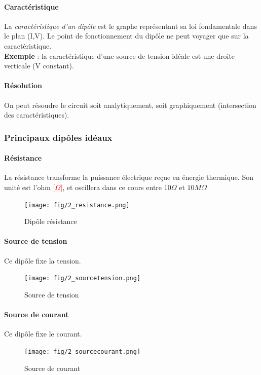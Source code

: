 \documentclass[a4paper]{article}
\begin{document}
    \paragraph{Caractéristique} La \textit{caractéristique d'un dipôle} est le
    graphe représentant sa loi fondamentale dans le plan (I,V). Le point de fonctionnement
    du dipôle ne peut voyager que sur la caractéristique. \\
    \textbf{Exemple} : la caractéristique d'une source de tension idéale est une
    droite verticale (V constant).

    \paragraph{Résolution} On peut résoudre le circuit soit analytiquement, soit
    graphiquement (intersection des caractéristiques).

    \subsubsection{Principaux dipôles idéaux}
    \paragraph{Résistance} La résistance transforme la puissance électrique reçue
    en énergie thermique. Son unité est l'ohm \textcolor{red}{[$\Omega$]}, et
    oscillera dans ce cours entre $10\Omega$ et $10M\Omega$
    \begin{figure}[H]
        \begin{center}
            \texttt{[image: fig/2\_resistance.png]}
            \caption{Dipôle résistance}
        \end{center}
    \end{figure}

    \paragraph{Source de tension} Ce dipôle fixe la tension.
    \begin{figure}[H]
        \begin{center}
            \texttt{[image: fig/2\_sourcetension.png]}
            \caption{Source de tension}
        \end{center}
    \end{figure}

    \paragraph{Source de courant} Ce dipôle fixe le courant.
    \begin{figure}[H]
        \begin{center}
            \texttt{[image: fig/2\_sourcecourant.png]}
            \caption{Source de courant}
        \end{center}
    \end{figure}
\end{document}

